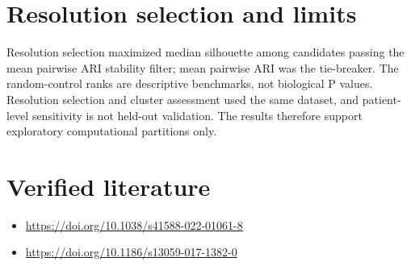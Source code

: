 \documentclass[11pt]{article}
\begin{document}
\section{Resolution selection and limits}
Resolution selection maximized median silhouette among candidates passing the mean pairwise ARI stability filter; mean pairwise ARI was the tie-breaker. The random-control ranks are descriptive benchmarks, not biological P values. Resolution selection and cluster assessment used the same dataset, and patient-level sensitivity is not held-out validation. The results therefore support exploratory computational partitions only.

\section{Verified literature}
\begin{itemize}
\item \url{https://doi.org/10.1038/s41588-022-01061-8}
\item \url{https://doi.org/10.1186/s13059-017-1382-0}
\end{itemize}
\end{document}
